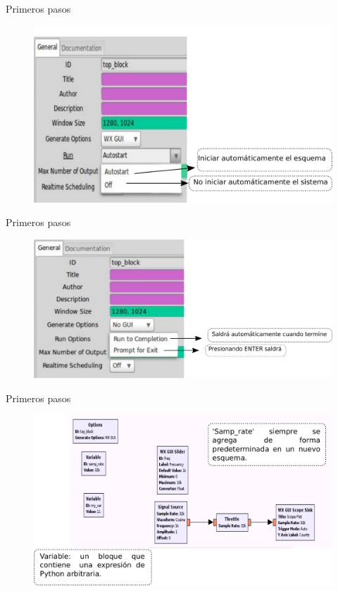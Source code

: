 \begin{frame}{Primeros pasos }
\begin{figure}[H]
\centering
\includegraphics[width=.9\textwidth]{parte1/lab1/pdf/lab1_6.pdf}
\end{figure}
\end{frame}

\begin{frame}{Primeros pasos }
\begin{figure}[H]
\centering
\includegraphics[width=\textwidth]{parte1/lab1/pdf/lab1_7.pdf}
\end{figure}
\end{frame}

\begin{frame}{Primeros pasos }
\begin{figure}[H]
\vspace{-1cm}
\centering
\includegraphics[width=\textwidth]{parte1/lab1/pdf/lab1_8.pdf}
\end{figure}
\end{frame}

